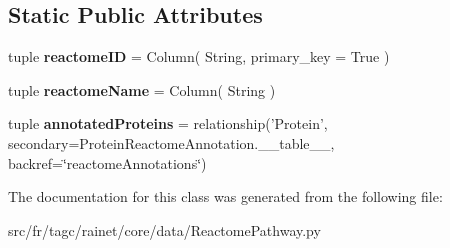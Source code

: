 \subsection*{Static Public Attributes}
\begin{DoxyCompactItemize}
\item 
\hypertarget{classsrc_1_1fr_1_1tagc_1_1rainet_1_1core_1_1data_1_1ReactomePathway_1_1ReactomePathway_aa1f884d9e04f46943c55ac63c002c1fd}{tuple {\bfseries reactome\-I\-D} = Column( String, primary\-\_\-key = True )}\label{classsrc_1_1fr_1_1tagc_1_1rainet_1_1core_1_1data_1_1ReactomePathway_1_1ReactomePathway_aa1f884d9e04f46943c55ac63c002c1fd}

\item 
\hypertarget{classsrc_1_1fr_1_1tagc_1_1rainet_1_1core_1_1data_1_1ReactomePathway_1_1ReactomePathway_a083bd306eb66a0493726b4ea5be2ce73}{tuple {\bfseries reactome\-Name} = Column( String )}\label{classsrc_1_1fr_1_1tagc_1_1rainet_1_1core_1_1data_1_1ReactomePathway_1_1ReactomePathway_a083bd306eb66a0493726b4ea5be2ce73}

\item 
\hypertarget{classsrc_1_1fr_1_1tagc_1_1rainet_1_1core_1_1data_1_1ReactomePathway_1_1ReactomePathway_a6216af4aa04b006bcebf2e2003558352}{tuple {\bfseries annotated\-Proteins} = relationship('Protein', secondary=Protein\-Reactome\-Annotation.\-\_\-\-\_\-table\-\_\-\-\_\-, backref=\char`\"{}reactome\-Annotations\char`\"{})}\label{classsrc_1_1fr_1_1tagc_1_1rainet_1_1core_1_1data_1_1ReactomePathway_1_1ReactomePathway_a6216af4aa04b006bcebf2e2003558352}

\end{DoxyCompactItemize}


The documentation for this class was generated from the following file\-:\begin{DoxyCompactItemize}
\item 
src/fr/tagc/rainet/core/data/Reactome\-Pathway.\-py\end{DoxyCompactItemize}
